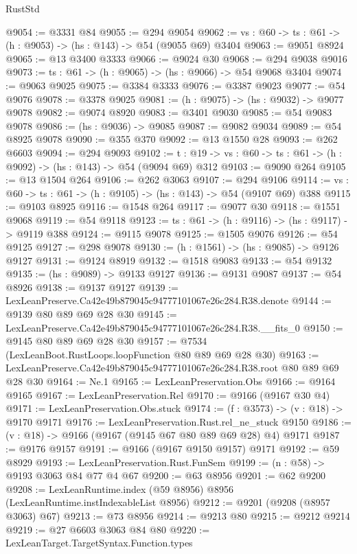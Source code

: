 \begin{lexlean}{RustStd}
\begin{coremodule}
@9054 := @3331 @84
@9055 := @294 @9054
@9062 := {vs : @60} -> {ts : @61} -> (h : @9053) -> (hs : @143) -> @54 (@9055 @69) @3404
@9063 := @9051 @8924
@9065 := @13 @3400 @3333
@9066 := @9024 @30
@9068 := @294 @9038 @9016
@9073 := {ts : @61} -> (h : @9065) -> (hs : @9066) -> @54 @9068 @3404
@9074 := @9063 @9025
@9075 := @3384 @3333
@9076 := @3387 @9023
@9077 := @54 @9076
@9078 := @3378 @9025
@9081 := (h : @9075) -> (hs : @9032) -> @9077 @9078
@9082 := @9074 @8920
@9083 := @3401 @9030
@9085 := @54 @9083 @9078
@9086 := (hs : @9036) -> @9085
@9087 := @9082 @9034
@9089 := @54 @8925 @9078
@9090 := @355 @370
@9092 := @13 @1550 @28
@9093 := @262 @6603
@9094 := @294 @9093
@9102 := {t : @19} -> {vs : @60} -> {ts : @61} -> (h : @9092) -> (hs : @143) -> @54 (@9094 @69) @312
@9103 := @9090 @264
@9105 := @13 @1504 @264
@9106 := @262 @3063
@9107 := @294 @9106
@9114 := {vs : @60} -> {ts : @61} -> (h : @9105) -> (hs : @143) -> @54 (@9107 @69) @388
@9115 := @9103 @8925
@9116 := @1548 @264
@9117 := @9077 @30
@9118 := @1551 @9068
@9119 := @54 @9118
@9123 := {ts : @61} -> (h : @9116) -> (hs : @9117) -> @9119 @388
@9124 := @9115 @9078
@9125 := @1505 @9076
@9126 := @54 @9125
@9127 := @298 @9078
@9130 := (h : @1561) -> (hs : @9085) -> @9126 @9127
@9131 := @9124 @8919
@9132 := @1518 @9083
@9133 := @54 @9132
@9135 := (hs : @9089) -> @9133 @9127
@9136 := @9131 @9087
@9137 := @54 @8926
@9138 := @9137 @9127
@9139 := LexLeanPreserve.Ca42e49b879045c94777101067e26c284.R38.denote
@9144 := @9139 @80 @89 @69 @28 @30
@9145 := LexLeanPreserve.Ca42e49b879045c94777101067e26c284.R38.__fits_0
@9150 := @9145 @80 @89 @69 @28 @30
@9157 := @7534 (LexLeanBoot.RustLoops.loopFunction @80 @89 @69 @28 @30)
@9163 := LexLeanPreserve.Ca42e49b879045c94777101067e26c284.R38.root @80 @89 @69 @28 @30
@9164 := Ne.{1}
@9165 := LexLeanPreservation.Obs
@9166 := @9164 @9165
@9167 := LexLeanPreservation.Rel
@9170 := @9166 (@9167 @30 @4)
@9171 := LexLeanPreservation.Obs.stuck
@9174 := (f : @3573) -> (v : @18) -> @9170 @9171
@9176 := LexLeanPreservation.Rust.rel_ne_stuck @9150
@9186 := (v : @18) -> @9166 (@9167 (@9145 @67 @80 @89 @69 @28) @4) @9171
@9187 := @9176 @9157
@9191 := @9166 (@9167 @9150 @9157) @9171
@9192 := @59 @8929
@9193 := LexLeanPreservation.Rust.FunSem
@9199 := (n : @58) -> @9193 @3063 @84 @77 @4 @67
@9200 := @63 @8956
@9201 := @62 @9200
@9208 := LexLeanRuntime.index (@59 @8956) @8956 (LexLeanRuntime.instIndexableList @8956)
@9212 := @9201 (@9208 (@8957 @3063) @67)
@9213 := @73 @8956
@9214 := @9213 @80
@9215 := @9212 @9214
@9219 := @27 @6603 @3063 @84 @80
@9220 := LexLeanTarget.TargetSyntax.Function.types

\end{coremodule}
\end{lexlean}

